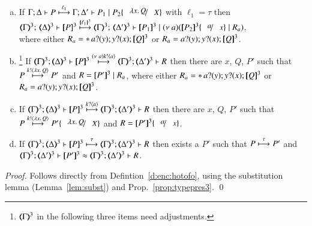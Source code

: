 \begin{proposition}
\begin{enumerate}[a)]
			\item	 
			   If  $\stytra{\Gamma}{\ell_1}{\Delta}{P}{\Delta'}{P_1 \Par P_2\subst{\abs{x}Q}{X}}$
			   with $\ell_1 = \tau$
			   then \\
			   $\mapt{\Gamma}^{3};\, \mapt{\Delta}^{3} \proves  \map{P}^{3} 
			   \hby{\mapa{\ell_1}^{3}}
			   \mapt{\Gamma}^{3};\, \mapt{\Delta'}^{3} \proves  \map{P_1}^{3} \Par \news{a}
			   (\map{P_2}^{3}\subst{a}{x} \Par R_a)$, \\
			   where 
			   either
			   $R_a = \ast\,{} a ? (y) ; y ? (x) ; [\!\![Q]\!\!]^3$ 
			   or $R_a = a ? (y) ; y ? (x) ; [\!\![Q]\!\!]^3$.
			   			   

			\item   \footnote{$(\!\!\langle\Gamma\rangle\!\!)^{3}$ in the following three items need adjustments.}
			If  $\stytra{\mapt{\Gamma}^{3}}{\news{a}\bactout{k}{a}}{\mapt{\Delta}^{3}}{\map{P}^{3}}{\mapt{\Delta'}^{3}}{R}$
			then there are $x$, $Q$, $P'$ such that \\
			$P \stackrel{k ! \langle \lambda x.\,Q \rangle}{\longmapsto} P'$
			and $R = [\!\![P']\!\!]^{3} \;|\; R_a$, where 
			   either
			   $R_a = \ast\,{} a ? (y) ; y ? (x) ; [\!\![Q]\!\!]^3$ 
			   or $R_a = a ? (y) ; y ? (x) ; [\!\![Q]\!\!]^3$.

			\item   
			If  $\stytra{\mapt{\Gamma}^{3}}{\bactinp{k}{a}}{\mapt{\Delta}^{3}}{\map{P}^{3}}{\mapt{\Delta'}^{3}}{R}$
			then there are $x$, $Q$, $P'$ such that \\
			$P \hby{\bactout{k}{\abs{x}Q}} P'\subst{\abs{x}Q}{X}$
			and $R = \map{P'}^{3}\subst{a}{x}$.
			
			\item   
			If  $\stytra{\mapt{\Gamma}^{3}}{\tau}{\mapt{\Delta}^{3}}{\map{P}^{3}}{\mapt{\Delta'}^{3}}{R}$
			then exists a $P'$ such that 
			$P \stackrel{\tau}{\longmapsto} P'$
			and $\wbb{\mapt{\Gamma}^{3}}{\ell}{\mapt{\Delta'}^{3}}{\map{P'}^{3}}{\mapt{\Delta'}^{3}}{R}$.
			    \end{enumerate}
\end{proposition}

\begin{proof}
Follows directly from Defintion~\ref{d:enc:hotofo}, using the substitution lemma (Lemma~\ref{lem:subst})
and Prop.~\ref{prop:typepres3}.
	\qed
\end{proof}

